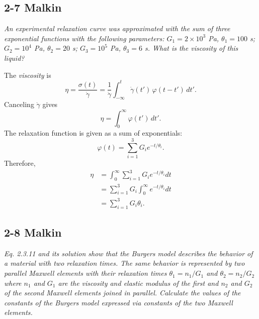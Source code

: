 \subsection{2-7 Malkin}
\textit{An experimental relaxation curve was approximated with the sum of three exponential functions with the following parameters:  $G_1 = 2 \times 10^3$ Pa, $\theta_1 = 100$ s; $G_2 = 10^4$ Pa, $\theta_2 = 20$ s; $G_3 = 10^5$ Pa, $\theta_3 = 6$ s.  What is the viscosity of this liquid?}

The \emph{viscosity} is 
\[
	\eta = \frac{\sigma(t)}{\dot\gamma}
	     = \frac{1}{\dot\gamma}
	\int_{-\infty}^{t} \dot\gamma(t')\,\varphi(t-t')\,dt'.
\]
Canceling $\dot\gamma$ gives
\[
	\eta = \int_{0}^{\infty} \varphi(t')\,dt'.
\]
The relaxation function is given as a sum of exponentials:
\[
	\varphi(t) = \sum_{i=1}^3 G_i e^{-t/\theta_i}.
\]
Therefore,
\begin{align*}
	\eta
	&= \int_0^\infty \sum_{i=1}^3 G_i e^{-t/\theta_i} dt \\
	&= \sum_{i=1}^3 G_i \int_0^\infty e^{-t/\theta_i} dt \\
	&= \boxed{\sum_{i=1}^3 G_i \theta_i}.
\end{align*}




\subsection{2-8 Malkin}
\textit{Eq. 2.3.11 and its solution show that the \emph{Burgers model} describes the behavior of a material with two relaxation times. The same behavior is represented by two parallel Maxwell elements with their relaxation times $\theta_1 = n_1/G_1$ and $\theta_2 = n_2/G_2$ where $n_1$ and $G_1$ are the viscosity and elastic modulus of the first and $n_2$ and $G_2$ of the second Maxwell elements  joined in parallel. Calculate the values of the constants of the Burgers model expressed via constants of the two Maxwell elements.}

